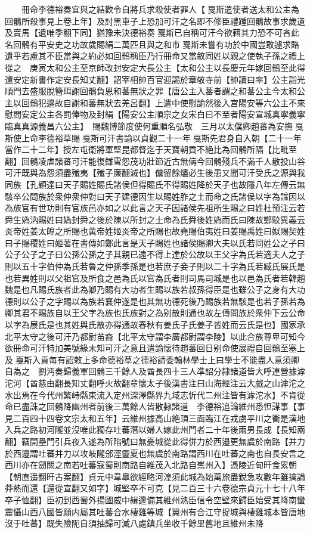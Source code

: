 　　冊命李德裕奏宜與之結歡令自將兵求殺使者罪人【戛斯遣使者送太和公主為回鶻所殺事見上卷上年】及討黑車子上恐加可汗之名即不修臣禮踵回鶻故事求歲遺及賣馬【遺唯季翻下同】猶豫未決德裕奏戛斯已自稱可汗今欲藉其力恐不可吝此名回鶻有平安史之功故歲賜絹二萬匹且與之和市戛斯未嘗有功於中國豈敢遽求賂遺乎若慮其不臣當與之約必如回鶻稱臣乃行冊命又當敘同姓以親之使執子孫之禮上從之　庚寅太和公主至京師改封安定大長公主【太和公主以長慶元年嫁回鶻至此得還安定新書作定安長知丈翻】詔宰相帥百官迎謁於章敬寺前【帥讀曰率】公主詣光順門去盛服脫簪珥謝回鶻負恩和蕃無狀之罪【唐公主入蕃者謂之和蕃公主今太和公主以回鶻犯邉故自謝和蕃無狀去羌呂翻】上遣中使慰諭然後入宫陽安等六公主不來慰問安定公主各罰俸物及封絹【陽安公主順宗之女宋白曰不至者陽安宣城真寧義寧臨真真源義昌六公主】　賜魏博節度使何重順名弘敬　三月以太僕卿趙蕃為安撫戛斯使上命李德裕草賜戛斯可汗書諭以貞觀二十一年戛斯先君身自入朝【二十一年當作二十二年】授左屯衛將軍堅昆都督迄于天寶朝貢不絶比為回鶻所隔【比毗至翻】回鶻凌虐諸蕃可汗能復讎雪怨茂功壯節近古無儔今回鶻殘兵不滿千人散投山谷可汗既與為怨須盡殱夷【殱子廉翻滅也】儻留餘燼必生後患又聞可汗受氏之源與我同族【孔穎達曰天子賜姓賜氏諸侯但得賜氏不得賜姓降於天子也故隱八年左傳云無駭卒公問族於衆仲衆仲對曰天子建德因生以賜姓胙之土而命之氏諸侯以字為諡因以為族官有世功則有官族邑亦如之以此言之天子因諸侯先祖所生賜之曰姓杜預注云若舜生媯汭賜姓曰媯封舜之後於陳以所封之土命為氏舜後姓媯而氏曰陳故鄭駮異義云炎帝姓姜太皥之所賜也黄帝姓姬炎帝之所賜也故堯賜伯夷姓曰姜賜禹姓曰姒賜契姓曰子賜稷姓曰姬著在書傳如鄭此言是天子賜姓也諸侯賜卿大夫以氏若同姓公之子曰公子公子之子曰公孫公孫之子其親已遠不得上達於公故以王父字為氏若適夫人之子則以五十字伯仲為氏若魯之仲孫季孫是也若庶子妾子則以二十字為氏若臧氏展氏是也若異姓則以父祖官及所食之邑為氏以官為氏者則司馬司城是也以邑為氏者若韓趙魏是也凡賜氏族者此為卿乃賜有大功者生賜以族若叔孫得臣是也雖公子之身有大功德則以公子之字賜以為族若襄仲遂是也其無功德死後乃賜族若無駭是也若子孫若為卿其君不賜族自以王父字為族也氏族對之為别散則通也故左傳問族於衆仲下云公命以字為展氏是也其姓與氏散亦得通故春秋有姜氏子氏姜子皆姓而云氏是也】國家承北平太守之後可汗乃都尉苖裔【北平太守謂李廣都尉謂李陵】以此合族尊卑可知今欲冊命可汗特加美號緣未知可汗之意且遣諭懷待趙蕃回日别命使展禮自回鶻至塞上及戛斯入貢每有詔敕上多命德裕草之德裕請委翰林學士上曰學士不能盡人意須卿自為之　劉沔奏歸義軍回鶻三千餘人及酋長四十三人凖詔分隸諸道皆大呼連營據滹沱河【酋慈由翻長知丈翻呼火故翻章懷太子後漢書注曰山海經注云大戲之山滹沱之水出焉在今代州繁峙縣東流入定州深澤縣界九域志忻代二州注皆有滹沱水】不肯從命已盡誅之回鶻降幽州者前後三萬餘人皆散隸諸道　李德裕追論維州悉怛謀事【事見二百四十四卷文宗太和五年】云維州據高山絶頂三面臨江在戎虜平川之衝是漢地入兵之路初河隴並沒唯此獨存吐蕃潛以婦人嫁此州門者二十年後兩男長成【長知兩翻】竊開壘門引兵夜入遂為所陷號曰無憂城從此得併力於西邉更無虞於南路【并力於西邉謂吐蕃并力以攻岐隴邠涇靈夏也無虞於南路謂西川在吐蕃之南也自長安言之西川亦在劒關之南若吐蕃寇蜀則南路自維茂入北路自嶲州入】憑陵近甸旰食累朝【朝直遥翻旰古案翻】貞元中韋臯欲經略河湟須此城為始萬旅盡銳急攻數年雖擒論莽熱而還【還從宣翻又如字】城堅卒不可克【見二百三十六卷德宗貞元十七十八年卒子恤翻】臣初到西蜀外揚國威中緝邊備其維州熟臣信令空壁來歸臣始受其降南蠻震懾山西八國皆願内屬其吐蕃合水棲雞等城【翼州有合江守捉城與棲雞城本皆唐地沒于吐蕃】既失險阨自須抽歸可減八處鎮兵坐收千餘里舊地且維州未降